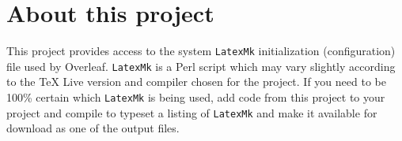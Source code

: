 \documentclass[a4paper]{article}
\begin{document}
\section*{About this project}
This project provides access to the system \texttt{LatexMk} initialization (configuration) file used by Overleaf.  \texttt{LatexMk} is a Perl script which may vary slightly according to the \TeX{} Live version and compiler chosen for the project. If you need to be 100\% certain which  \texttt{LatexMk} is being used, add code from this project to your project and compile to typeset a listing of \texttt{LatexMk} and make it available for download as one of the output files.
\end{document}
